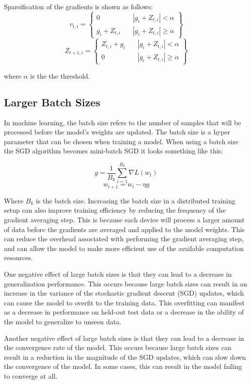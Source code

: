 \documentclass[11pt]{article}
\begin{document}
Sparsification of the gradients is shown as follows: 
$$
v_{t,i} =
\left\{
	\begin{array}{cc}
		0 & \quad \left| g_i + Z_{t,i}\right| < \alpha \\
		g_i + Z_{t,i} & \quad \left| g_i + Z_{t,i}\right| \geq \alpha
	\end{array}
\right\}
$$
$$
Z_{t+1,i} =
\left\{
	\begin{array}{cc}
		Z_{t,i} + g_i & \quad \left| g_i + Z_{t,i}\right| < \alpha \\
		0	& \quad \left| g_i + Z_{t,i}\right| \geq \alpha
	\end{array}
\right\}
$$

where $\alpha$ is the the threshold.


\subsection{Larger Batch Sizes}
In machine learning, the batch size refers to the number of samples that will be processed before the model's weights are updated. The batch size is a hyper parameter that can be chosen when training a model. When using a batch size the SGD algorithm becomes mini-batch SGD it looks something like this:

$$
g = \frac{1}{B_k} \sum_{i=1}^{B_k} {\nabla} L(w_t)
$$
$$
w_{t+1} = w_t - \eta g
$$ 


Where $B_k$ is the batch size. Increasing the batch size in a distributed training setup can also improve training efficiency by reducing the frequency of the gradient averaging step. This is because each device will process a larger amount of data before the gradients are averaged and applied to the model weights. This can reduce the overhead associated with performing the gradient averaging step, and can allow the model to make more efficient use of the available computation resources.

One negative effect of large batch sizes is that they can lead to a decrease in generalization performance. This occurs because large batch sizes can result in an increase in the variance of the stochastic gradient descent (SGD) updates, which can cause the model to overfit to the training data. This overfitting can manifest as a decrease in performance on held-out test data or a decrease in the ability of the model to generalize to unseen data.

Another negative effect of large batch sizes is that they can lead to a decrease in the convergence rate of the model. This occurs because large batch sizes can result in a reduction in the magnitude of the SGD updates, which can slow down the convergence of the model. In some cases, this can result in the model failing to converge at all.
\end{document}
